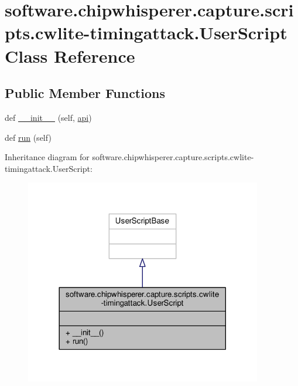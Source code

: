 \hypertarget{classsoftware_1_1chipwhisperer_1_1capture_1_1scripts_1_1cwlite-timingattack_1_1UserScript}{}\section{software.\+chipwhisperer.\+capture.\+scripts.\+cwlite-\/timingattack.User\+Script Class Reference}
\label{classsoftware_1_1chipwhisperer_1_1capture_1_1scripts_1_1cwlite-timingattack_1_1UserScript}
\subsection*{Public Member Functions}
\begin{DoxyCompactItemize}
\item 
def \hyperlink{classsoftware_1_1chipwhisperer_1_1capture_1_1scripts_1_1cwlite-timingattack_1_1UserScript_a7ed994f9ae9ff324eb313e3e35fd6a1f}{\+\_\+\+\_\+init\+\_\+\+\_\+} (self, \hyperlink{namespacesoftware_1_1chipwhisperer_1_1capture_1_1scripts_1_1cwlite-timingattack_a452abda888c34b0cc5d5684b00602f9e}{api})
\item 
def \hyperlink{classsoftware_1_1chipwhisperer_1_1capture_1_1scripts_1_1cwlite-timingattack_1_1UserScript_aa16c2b2a310537131e46e494a5063716}{run} (self)
\end{DoxyCompactItemize}


Inheritance diagram for software.\+chipwhisperer.\+capture.\+scripts.\+cwlite-\/timingattack.User\+Script\+:\nopagebreak
\begin{figure}[H]
\begin{center}
\leavevmode
\includegraphics[width=293pt]{d2/d2c/classsoftware_1_1chipwhisperer_1_1capture_1_1scripts_1_1cwlite-timingattack_1_1UserScript__inherit__graph}
\end{center}
\end{figure}



